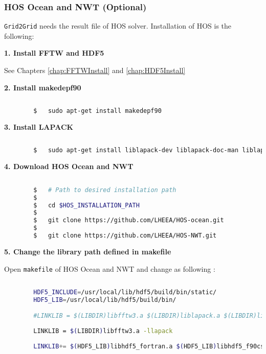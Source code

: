 		
		\pagebreak
		\subsubsection{HOS Ocean and NWT (Optional)}
		
		\texttt{Grid2Grid} needs the result file of HOS solver. Installation of HOS is the following: 
		
		\vspace{1em}
		\textbf{1. Install FFTW and HDF5}
		
		See Chapters \ref{chap:FFTWInstall} and \ref{chap:HDF5Install}
		
		\vspace{1em}
		\textbf{2. Install makedepf90}
		
		\begin{lstlisting}[language=bash]		
		
		$	sudo apt-get install makedepf90		
		\end{lstlisting}
		
		\vspace{1em}
		\textbf{3. Install LAPACK}
		
		\begin{lstlisting}[language=bash]
		
		$	sudo apt-get install liblapack-dev liblapack-doc-man liblapack-doc liblapack-pic liblapack3 liblapack-test liblapack3gf liblapacke liblapacke-dev
		\end{lstlisting}
		
		\vspace{1em}
		\textbf{4. Download HOS Ocean and NWT}
		
		\begin{lstlisting}[language=bash]
		
		$	# Path to desired installation path
		$
		$	cd $HOS_INSTALLATION_PATH
		$
		$	git clone https://github.com/LHEEA/HOS-ocean.git
		$
		$	git clone https://github.com/LHEEA/HOS-NWT.git		
		\end{lstlisting}
		
		\vspace{1em}
		\textbf{5. Change the library path defined in makefile}
		
		Open \texttt{makefile} of HOS Ocean and NWT and change as following : 
		
		\begin{lstlisting}[language=bash]
		
		HDF5_INCLUDE=/usr/local/lib/hdf5/build/bin/static/
		HDF5_LIB=/usr/local/lib/hdf5/build/bin/

		#LINKLIB = $(LIBDIR)libfftw3.a $(LIBDIR)liblapack.a $(LIBDIR)librefblas.a
		
		LINKLIB = $(LIBDIR)libfftw3.a -llapack
		
		LINKLIB+= $(HDF5_LIB)libhdf5_fortran.a $(HDF5_LIB)libhdf5_f90cstub.a $(HDF5_LIB)libhdf5.a $(HDF5_LIB)libszip.a $(HDF5_LIB)libz.a -ldl -pthread
		
		\end{lstlisting}
		
